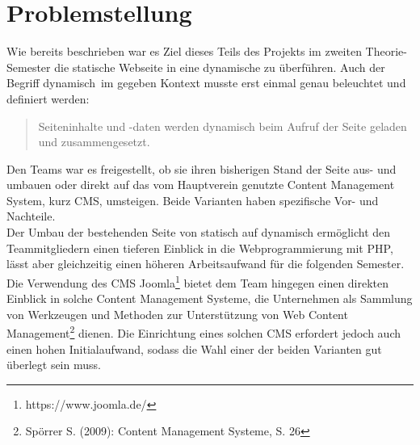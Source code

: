 \documentclass[12pt,a4paper]{article}
\begin{document}
\section{Problemstellung}
Wie bereits beschrieben war es Ziel dieses Teils des Projekts im zweiten Theorie-Semester die statische Webseite in eine dynamische zu überführen. Auch der Begriff \glqq dynamisch\grqq \ im gegeben Kontext musste erst einmal genau beleuchtet und definiert werden:
\begin{quote}
Seiteninhalte und -daten werden dynamisch beim Aufruf der Seite geladen und zusammengesetzt.
\end{quote}
Den Teams war es freigestellt, ob sie ihren bisherigen Stand der Seite aus- und umbauen oder direkt auf das vom Hauptverein genutzte Content Management System, kurz \glqq CMS\grqq, umsteigen. Beide Varianten haben spezifische Vor- und Nachteile.\\
Der Umbau der bestehenden Seite von statisch auf dynamisch ermöglicht den Teammitgliedern einen tieferen Einblick in die Webprogrammierung mit PHP, lässt aber gleichzeitig einen höheren Arbeitsaufwand für die folgenden Semester.\\
Die Verwendung des CMS Joomla\footnote{\label{foot:Joomla} https://www.joomla.de/} bietet dem Team hingegen einen direkten Einblick in solche Content Management Systeme, die Unternehmen als \glqq Sammlung von Werkzeugen und Methoden zur Unterstützung von Web Content Management\grqq\footnote{\label{foot:CMS} Spörrer S. (2009): Content Management Systeme, S. 26} dienen. Die Einrichtung eines solchen CMS erfordert jedoch auch einen hohen Initialaufwand, sodass die Wahl einer der beiden Varianten gut überlegt sein muss.
\end{document}
